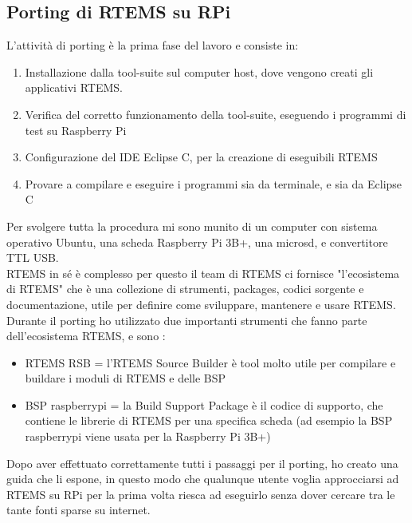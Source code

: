 \documentclass[12pt, a4paper, titlepage, oneside]{book}
\begin{document}
\begin{flushleft}
\chapter{Porting di RTEMS su RPi}


L'attività di porting è la prima fase del lavoro e consiste in:
\begin{enumerate}
    \item Installazione dalla tool-suite sul computer host, dove vengono creati gli applicativi RTEMS.
    \item Verifica del corretto funzionamento della tool-suite, eseguendo i programmi di test su Raspberry Pi
    \item Configurazione del IDE Eclipse C, per la creazione di eseguibili RTEMS
    \item Provare a compilare e eseguire i programmi sia da terminale, e sia da Eclipse C
\end{enumerate}
Per svolgere tutta la procedura mi sono munito di un computer con sistema operativo Ubuntu, una scheda Raspberry Pi 3B+, una microsd, e convertitore TTL USB.\\

RTEMS in sé è complesso per questo il team di RTEMS ci fornisce "l'ecosistema di RTEMS" che è una collezione di strumenti, packages, codici sorgente e documentazione, utile per definire come sviluppare, mantenere e usare RTEMS.\\
Durante il porting ho utilizzato due importanti strumenti che fanno parte dell'ecosistema RTEMS, e sono :
\begin{itemize}
    \item RTEMS RSB = l'RTEMS Source Builder è tool molto utile per compilare e buildare i moduli di RTEMS e delle BSP 
    \item BSP  raspberrypi = la Build Support Package è il codice di supporto, che contiene le librerie di RTEMS per una specifica scheda (ad esempio la BSP raspberrypi viene usata per la Raspberry Pi 3B+)
\end{itemize}
Dopo aver effettuato correttamente tutti i passaggi per il porting, ho creato una guida che li espone, in questo modo che qualunque utente voglia approcciarsi ad RTEMS su RPi per la prima volta riesca ad eseguirlo senza dover cercare tra le tante fonti sparse su internet.


\end{flushleft}
\end{document}
